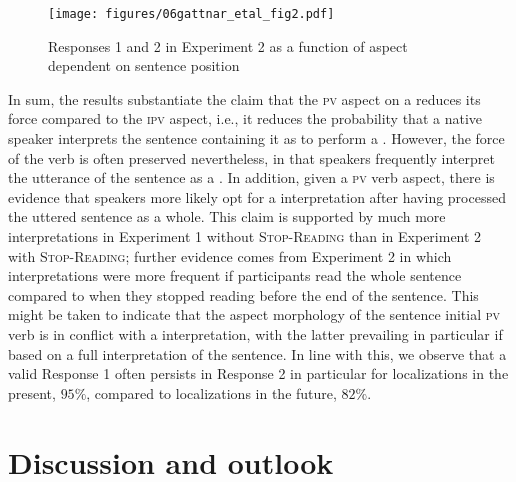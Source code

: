 \documentclass[output=paper,colorlinks,citecolor=brown,newtxmath,hidelinks]{langscibook}
\begin{document}
\begin{figure}
\texttt{[image: figures/06gattnar\_etal\_fig2.pdf]}
\caption{Responses 1 and 2 in Experiment 2 as a function of aspect dependent on sentence position}
\label{fig:zwei}
\end{figure}

In sum, the results substantiate the claim that the \textsc{pv} aspect on a  reduces its  force compared to the \textsc{ipv} aspect, i.e., it reduces the probability that a native speaker interprets the sentence containing it as to perform a . However, the  force of the verb is often preserved nevertheless, in that speakers frequently interpret the utterance of the sentence as a . In addition, given a \textsc{pv} verb aspect, there is evidence that speakers more likely opt for a  interpretation after having processed the uttered sentence as a whole. This claim is supported by much more  interpretations in Experiment 1 without \textsc{Stop-Reading} than in Experiment 2 with \textsc{Stop-Reading}; further evidence comes from Experiment 2 in which  interpretations were more frequent if participants read the whole sentence compared to when they stopped reading before the end of the sentence. This might be taken to indicate that the aspect morphology of the sentence initial \textsc{pv} verb is in conflict with a  interpretation, with the latter prevailing in particular if based on a full interpretation of the sentence. In line with this, we observe that a valid Response 1 often persists in Response 2 in particular for localizations in the present, $95\%$, compared to localizations in the future, $82\%$.

\section{Discussion and outlook}\label{sct:drei}
\end{document}
